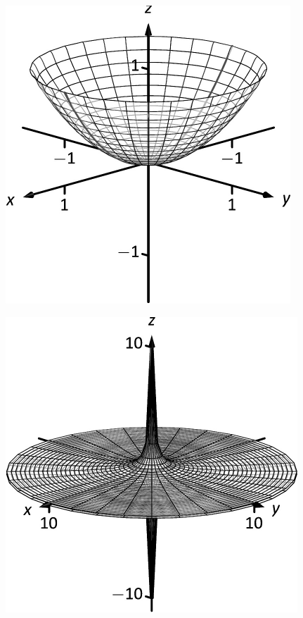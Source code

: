 \documentclass[10pt]{article}
\begin{document}
\includegraphics{fig10_01_ex_31_3DBW.pdf}
\texttt{}

\includegraphics{fig10_01_ex_32_3DBW.pdf}
\texttt{}
\end{document}
